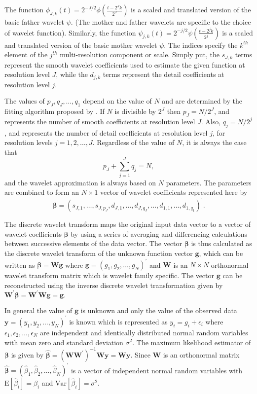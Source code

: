 \documentclass[a4paper, 12pt]{article}
\begin{document}
\noindent
The function $\phi_{J,k}(t) = 2^{-J/2} \phi(\frac{t-2^{J}k}{2^{J}})$ is a scaled and translated version of the basic father wavelet $\psi$. (The mother and father wavelets are specific to the choice of wavelet function). Similarly, the function $\psi_{j,k}(t) = 2^{-j/2} \psi(\frac{t-2^{j}k}{2^{j}})$ is a scaled and translated version of the basic mother wavelet $\psi$. The indices specify the $k^{th}$ element of the $j^{th}$ multi-resolution component or scale. Simply put,  the $s_{J,k}$ terms represent the smooth wavelet coefficients used to estimate the given function at resolution level $J$, while the $d_{j,k}$ terms represent the detail coefficients at resolution level $j$. 

\medskip
The values of $p_J, q_J, \ldots, q_1$ depend on the value of $N$ and are determined by the fitting algorithm proposed by \cite{mallat89}. If $N$ is divisible by $2^J$ then $p_J = N/2^J$, and represents the number of smooth coefficients at resolution level $J$. Also, $q_j=N/2^j$, and represents the number of detail coefficients at resolution level $j$, for resolution levels $j=1,2,\ldots, J$. Regardless of the value of $N$, it is always the case that
$$p_J + \sum_{j=1}^J q_j = N,$$
and the wavelet approximation is always based on $N$ parameters. The parameters are combined to form an $N \times 1$ vector of wavelet coefficients represented here by
\begin{equation}\label{eq:betacoef}
\bm{\beta} = (s_{J,1}, \ldots, s_{J,p_{J}}, d_{J,1}, \ldots, d_{J,q_{J}}, \ldots, d_{1,1}, \ldots, d_{1,q_{1}})^{\prime}.
\end{equation}

\medskip
The discrete wavelet transform maps the original input data vector to a vector of wavelet coefficients $\bm{\beta}$ by using a series of averaging and differencing calculations between successive elements of the data vector. The vector $\bm{\beta}$ is thus calculated as the discrete wavelet transform of the unknown function vector $\mathbf{g}$, which can be written as $\bm{\beta} = \mathbf{W} \mathbf{g}$ where $\mathbf{g} = (g_{1}, g_{2}, \dots, g_{N})^{\prime}$ and $\mathbf{W}$ is an $N \times N$ orthonormal wavelet transform matrix which is wavelet family specific. The vector $\mathbf{g}$ can be reconstructed using the inverse discrete wavelet transformation given by $\mathbf{W}^{\prime} \bm{\beta} = \mathbf{W}^{\prime} \mathbf{W} \mathbf{g} = \mathbf{g}.$

\medskip
In general the value of $\mathbf{g}$ is unknown and only the value of the observed data $\mathbf{y} = (y_{1}, y_{2}, \dots, y_{N})^{\prime}$ is known which is represented as $y_{i} = g_{i} + \epsilon_{i}$ where $\epsilon_{1}, \epsilon_{2}, \ldots, \epsilon_{N}$ are independent and identically distributed normal random variables with mean zero and standard deviation $\sigma^{2}$. The maximum likelihood estimator of $\bm{\beta}$ is given by $\hat{\bm{\beta}} = (\mathbf{W}\mathbf{W}^{\prime})^{-1} \mathbf{W} \mathbf{y} = \mathbf{W} \mathbf{y}.$ Since $\mathbf{W}$ is an orthonormal matrix $\hat{\bm{\beta}} = (\hat{\beta}_{1}, \hat{\beta}_{2}, \dots, \hat{\beta}_{N})^{\prime}$ is a vector of independent normal random variables with $\mathrm{E}[\hat{\beta}_{i}] = \beta_{i}$ and $\mathrm{Var}[\hat{\beta}_{i}] = \sigma^{2}$.
\end{document}
